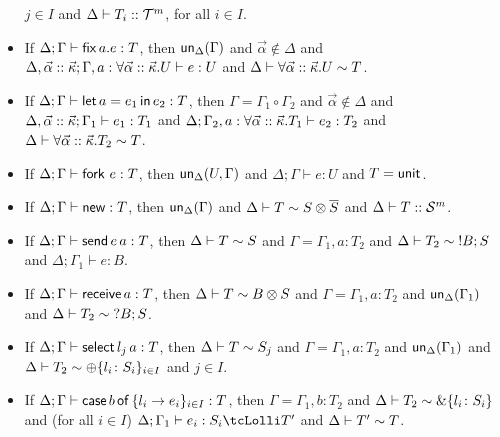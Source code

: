 \begin{lemma}
\begin{itemize}
    $j\in I$ and
    $\Delta\vdash T_i::\mathcal T^m$, for all $i\in I$.
  \item %
    If $\Delta;\Gamma \vdash \mathsf{fix}\,{a}.{e} : T$, then
    $\mathsf{un}_\Delta(\Gamma)$ and
    $\vec\alpha\notin\Delta$ and
    $\Delta, \vec\alpha::\vec{\kappa};\Gamma,
    a:\forall\vec\alpha::\vec{\kappa}. U \vdash e: U$ and
    $\Delta \vdash \forall\vec\alpha::\vec{\kappa}. U \sim T$.
  \item %
    If $\Delta;\Gamma \vdash \mathsf{let}\,{a}={e_1}\,\mathsf{in}\,{e_2} : T$, then
    $\Gamma = \Gamma_1 \circ \Gamma_2$ and
    $\vec\alpha\notin\Delta$ and
    $\Delta, \vec\alpha::\vec{\kappa}; \Gamma_1 \vdash e_1 : T_1$ and
    $\Delta;\Gamma_2,
    a:\forall\vec\alpha::\vec{\kappa}. T_1 \vdash e_2: T_2$ and
    $\Delta \vdash \forall\vec\alpha::\vec{\kappa}. T_2 \sim T$.
  \item %
    If $\Delta;\Gamma \vdash \mathsf{fork}\,{\,}e:T$, then
    $\mathsf{un}_\Delta(U,\Gamma)$ and
    $\Delta;\Gamma \vdash e : U$ and
    $T = \mathsf{unit}$.
  \item %
    If $\Delta;\Gamma \vdash \mathsf{new} : T$,
    then $\mathsf{un}_\Delta(\Gamma)$ and
    $\Delta \vdash T \sim S\otimes\overline{S}$ and
    $\Delta \vdash T::\mathcal S^m$.
  \item %
    If $\Delta;\Gamma \vdash \mathsf{send}\, e\, a : T$, then
    $\Delta \vdash T \sim S$ and
    $\Gamma = \Gamma_1, a\colon T_2$ and
    $\Delta \vdash T_2 \sim \;!B;S$ and
    $\Delta;\Gamma_1 \vdash e \colon B$.
  \item %
    If $\Delta;\Gamma \vdash \mathsf{receive}\, a : T$, then
    $\Delta \vdash T \sim B \otimes S$ and 
    $\Gamma = \Gamma_1, a\colon T_2$ and
    $\mathsf{un}_\Delta(\Gamma_1)$ and
    $\Delta \vdash T_2 \sim \;?B;S$.
  \item %
    If $\Delta;\Gamma \vdash \mathsf{select}{\,{l_j}\,{a}} : T$, then
    $\Delta \vdash T \sim S_j$ and
    $\Gamma = \Gamma_1, a\colon T_2$ and
    $\mathsf{un}_\Delta(\Gamma_1)$ and $\Delta \vdash T_2 \sim
    \oplus \{ l_i\colon S_i \}_{i\in I}$ and $j\in I$.
  \item %
    If $\Delta;\Gamma \vdash \mathsf{case}\,b\,\mathsf{of}\,\{l_i\rightarrow
    e_i\}_{i\in I} : T$, then
    $\Gamma =  \Gamma_1, b\colon T_2$ and  
    $\Delta \vdash T_2 \sim  \& \{ l_i\colon S_i \}$ and
    (for all $i\in I$)
    $\Delta; \Gamma_1 \vdash e_i : S_i \tcLolli T'$ and
    $\Delta \vdash T' \sim T$.
  \end{itemize}
\end{lemma}
